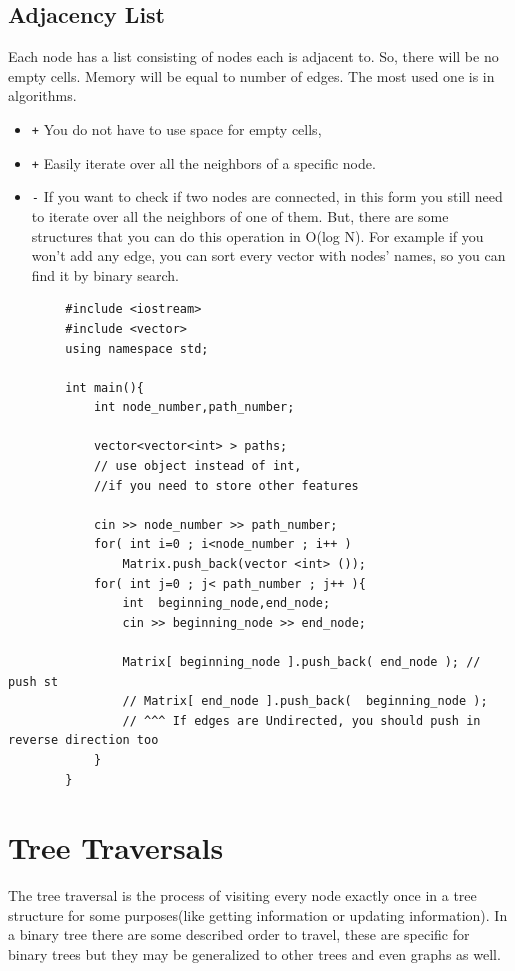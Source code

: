 \documentclass[12pt]{article}
\begin{document}
    \subsection{Adjacency List}
    Each node has a list consisting of nodes each is adjacent to. So, there will be no empty cells. Memory will be equal to number of edges. The most used one is in algorithms.
        \begin{itemize}
             \item \texttt + You do not have to use space for empty cells, 
    
             \item \texttt + Easily iterate over all the neighbors of a specific node.
             \item \texttt - If you want to check if two nodes are connected, in this form you still need to iterate over all the neighbors of one of them. But, there are some structures that you can do this operation in O(log N). For example if you won't add any edge, you can sort every vector with nodes' names, so you can find it by binary search.  
            
         \end{itemize} 
        \begin{verbatim}
        #include <iostream>
        #include <vector>
        using namespace std;
        
        int main(){
            int node_number,path_number;
            
            vector<vector<int> > paths; 
            // use object instead of int, 
            //if you need to store other features
            
            cin >> node_number >> path_number;
            for( int i=0 ; i<node_number ; i++ )
                Matrix.push_back(vector <int> ());
            for( int j=0 ; j< path_number ; j++ ){
                int  beginning_node,end_node;
                cin >> beginning_node >> end_node;
                
                Matrix[ beginning_node ].push_back( end_node ); // push st
                // Matrix[ end_node ].push_back(  beginning_node ); 
                // ^^^ If edges are Undirected, you should push in reverse direction too
            }
        }
        \end{verbatim}
\section{Tree Traversals}
     The tree traversal is the process of visiting every node exactly once in a tree structure  for some purposes(like getting information or updating information). In a binary tree there are some described order to travel, these are specific for binary trees but they may be generalized to other trees and even graphs as well. \cite{Traversal}
\end{document}
